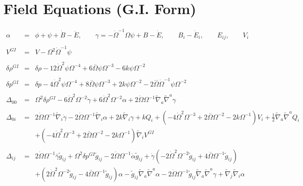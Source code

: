 \documentclass[10pt,letterpaper]{article}
\numberwithin{equation}{section}
\begin{document}
\section{Field Equations (G.I. Form)}
\begin{eqnarray}
\alpha  &=& \phi + \psi + \dot B - \ddot E,\qquad \gamma = - \dot\Omega^{-1}\Omega \psi + B - \dot E,
\qquad B_i - \dot E_i,\qquad E_{ij},\qquad V_i
\\ \nonumber\\
V^{GI} &=& V-\Omega^2 \dot \Omega^{-1}\psi
\\ \nonumber\\
\delta \rho^{GI}&=&\delta \rho - 12 \dot{\Omega}^2 \psi \Omega^{-4} + 6 \overset{..}{\Omega} \psi \Omega^{-3} - 6 k \psi \Omega^{-2}
\\ \nonumber\\ 
\delta p^{GI}&=&\delta p - 4 \dot{\Omega}^2 \psi \Omega^{-4} + 8 \overset{..}{\Omega} \psi \Omega^{-3} + 2 k \psi \Omega^{-2} - 2 \overset{...}{\Omega} \dot{\Omega}^{-1} \psi \Omega^{-2}
\\ \nonumber\\
\Delta_{00}&=& \Omega^2 \delta \rho^{GI}{} - 6 \dot{\Omega}^2 \Omega^{-2} \dot{\gamma} + 6 \dot{\Omega}^2 \Omega^{-2} \alpha + 2 \dot{\Omega} \Omega^{-1} \tilde{\nabla}_{a}\tilde{\nabla}^{a}\gamma 
\\  \nonumber\\ 
\Delta_{0i}&=& 2 \dot{\Omega} \Omega^{-1} \tilde{\nabla}_{i}\dot{\gamma} - 2 \dot{\Omega} \Omega^{-1} \tilde{\nabla}_{i}\alpha + 2 k \tilde{\nabla}_{i}\gamma +k Q_{i} + (-4 \dot{\Omega}^2 \Omega^{-3} + 2 \overset{..}{\Omega} \Omega^{-2} - 2 k \Omega^{-1}) V_{i} + \tfrac{1}{2} \tilde{\nabla}_{a}\tilde{\nabla}^{a}Q_{i} \nonumber \\ 
&& + (-4 \dot{\Omega}^2 \Omega^{-3} + 2 \overset{..}{\Omega} \Omega^{-2} - 2 k \Omega^{-1}) \tilde{\nabla}_{i}V^{GI}{}
\\  \nonumber\\ 
\Delta_{ij}&=& 2 \dot{\Omega} \Omega^{-1} \overset{..}{\gamma} \tilde{g}_{ij} + \Omega^2 \delta p^{GI}{} \tilde{g}_{ij} - 2 \dot{\Omega} \Omega^{-1} \dot{\alpha} \tilde{g}_{ij} + \dot{\gamma} (-2 \dot{\Omega}^2 \Omega^{-2} \tilde{g}_{ij} + 4 \overset{..}{\Omega} \Omega^{-1} \tilde{g}_{ij}) \nonumber \\ 
&& + (2 \dot{\Omega}^2 \Omega^{-2} \tilde{g}_{ij} - 4 \overset{..}{\Omega} \Omega^{-1} \tilde{g}_{ij}) \alpha -  \tilde{g}_{ij} \tilde{\nabla}_{a}\tilde{\nabla}^{a}\alpha - 2 \dot{\Omega} \Omega^{-1} \tilde{g}_{ij} \tilde{\nabla}_{a}\tilde{\nabla}^{a}\gamma + \tilde{\nabla}_{j}\tilde{\nabla}_{i}\alpha \nonumber \\ 

\end{eqnarray}
\end{document}
